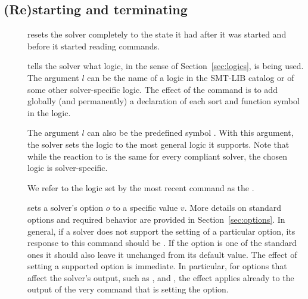 \subsection{(Re)starting and terminating} \label{sec:restarting}

\begin{description}

%
\item[]
resets the solver completely to the state it had after it was started
and before it started reading commands.
\smallskip

%
\item[]
tells the solver what logic, in the sense of Section~\ref{sec:logics},
is being used.
The argument $l$ can be the name of a logic in the SMT-LIB catalog or 
of some other solver-specific logic.
The effect of the command is to add globally (and permanently)
a declaration of each sort and function symbol in the logic.

The argument $l$ can also be the predefined symbol .
With this argument, the solver sets the logic to the most general logic 
it supports.
Note that while the reaction to  is the same 
for every compliant solver, the chosen logic is solver-specific.

We refer to the logic set by the most recent  command as 
the .
\smallskip

%
\item[]
sets a solver's option $o$ to a specific value $v$.
More details on standard options and required behavior are provided 
in Section~\ref{sec:options}.  
In general, if a solver does not support the setting of a particular option,
its response to this command should be .
If the option is one of the standard ones it should also leave it unchanged 
from its default value.  
The effect of setting a supported option is immediate.
In particular, for options that affect the solver's output, such as 
,  and 
, 
the effect applies already to the output of the very command 
that is setting the option.


\end{description}
